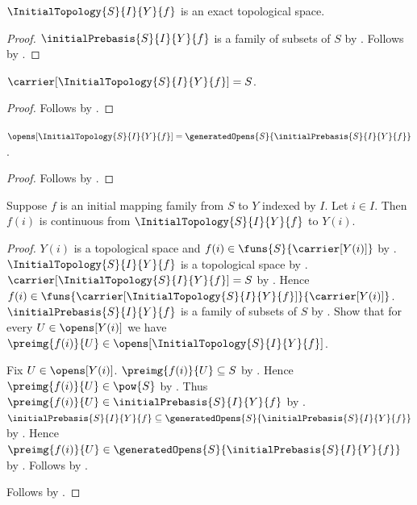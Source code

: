 \begin{theorem}\label{initial_topology_is_exact}
    $\InitialTopology{S}{I}{Y}{f}$ is an exact topological space.
\end{theorem}
\begin{proof}
    $\initialPrebasis{S}{I}{Y}{f}$ is a family of subsets of $S$ by
        .
    Follows by
        .
\end{proof}

\begin{proposition}\label{initial_topology_carrier}
    $\carrier[\InitialTopology{S}{I}{Y}{f}]=S$.
\end{proposition}
\begin{proof}
    Follows by
        .
\end{proof}

\begin{proposition}\label{initial_topology_opens}
    $\opens[\InitialTopology{S}{I}{Y}{f}]
        =\generatedOpens{S}{\initialPrebasis{S}{I}{Y}{f}}$.
\end{proposition}
\begin{proof}
    Follows by
        .
\end{proof}

\begin{theorem}\label{initial_topology_projection_continuous}
    Suppose $f$ is an initial mapping family from $S$ to $Y$ indexed by $I$.
    Let $i\in I$.
    Then $f(i)$ is continuous from $\InitialTopology{S}{I}{Y}{f}$
        to $Y(i)$.
\end{theorem}
\begin{proof}
    $Y(i)$ is a topological space and
        $f(i)\in\funs{S}{\carrier[Y(i)]}$ by
        .
    $\InitialTopology{S}{I}{Y}{f}$ is a topological space by
        .
    $\carrier[\InitialTopology{S}{I}{Y}{f}]=S$ by
        .
    Hence $f(i)\in
        \funs{\carrier[\InitialTopology{S}{I}{Y}{f}]}{\carrier[Y(i)]}$.
    $\initialPrebasis{S}{I}{Y}{f}$ is a family of subsets of $S$ by
        .
    Show that for every $U\in\opens[Y(i)]$ we have
        $\preimg{f(i)}{U}\in\opens[\InitialTopology{S}{I}{Y}{f}]$.
    \begin{subproof}
        Fix $U\in\opens[Y(i)]$.
        $\preimg{f(i)}{U}\subseteq S$ by
            .
        Hence $\preimg{f(i)}{U}\in\pow{S}$ by
            .
        Thus $\preimg{f(i)}{U}\in\initialPrebasis{S}{I}{Y}{f}$ by
            .
        $\initialPrebasis{S}{I}{Y}{f}
            \subseteq\generatedOpens{S}{\initialPrebasis{S}{I}{Y}{f}}$
            by .
        Hence $\preimg{f(i)}{U}
            \in\generatedOpens{S}{\initialPrebasis{S}{I}{Y}{f}}$ by
            .
        Follows by .
    \end{subproof}
    Follows by .
\end{proof}

